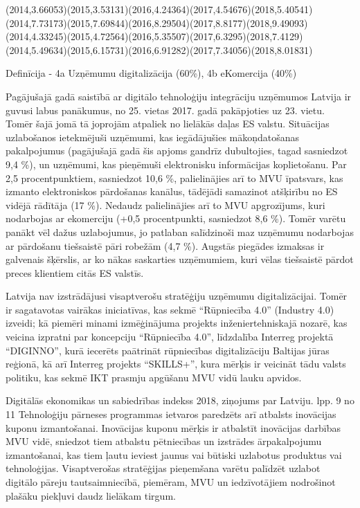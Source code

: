  {(2014,3.66053)(2015,3.53131)(2016,4.24364)(2017,4.54676)(2018,5.40541)}
  {(2014,7.73173)(2015,7.69844)(2016,8.29504)(2017,8.8177)(2018,9.49093)}
  {(2014,4.33245)(2015,4.72564)(2016,5.35507)(2017,6.3295)(2018,7.4129)}
  {(2014,5.49634)(2015,6.15731)(2016,6.91282)(2017,7.34056)(2018,8.01831)}

  Definīcija - 4a Uzņēmumu digitalizācija (60\%), 4b eKomercija (40\%)
\par

Pagājušajā gadā saistībā ar digitālo tehnoloģiju integrāciju uzņēmumos Latvija ir guvusi
labus panākumus, no 25. vietas 2017. gadā pakāpjoties uz 23. vietu. Tomēr šajā jomā tā
joprojām atpaliek no lielākās daļas ES valstu. Situācijas uzlabošanos ietekmējuši uzņēmumi,
kas iegādājušies mākoņdatošanas pakalpojumus (pagājušajā gadā šis apjoms gandrīz
dubultojies, tagad sasniedzot 9,4 \%), un uzņēmumi, kas pieņēmuši elektronisku informācijas
koplietošanu. Par 2,5 procentpunktiem, sasniedzot 10,6 \%, palielinājies arī to MVU īpatsvars,
kas izmanto elektroniskos pārdošanas kanālus, tādējādi samazinot atšķirību no ES vidējā
rādītāja (17 \%). Nedaudz palielinājies arī to MVU apgrozījums, kuri nodarbojas ar ekomerciju 
(+0,5 procentpunkti, sasniedzot 8,6 \%). Tomēr varētu panākt vēl dažus
uzlabojumus, jo patlaban salīdzinoši maz uzņēmumu nodarbojas ar pārdošanu tiešsaistē pāri
robežām (4,7 \%). Augstās piegādes izmaksas ir galvenais šķērslis, ar ko nākas saskarties
uzņēmumiem, kuri vēlas tiešsaistē pārdot preces klientiem citās ES valstīs.
\par
Latvija nav izstrādājusi visaptverošu stratēģiju uzņēmumu digitalizācijai. Tomēr ir
sagatavotas vairākas iniciatīvas, kas sekmē “Rūpniecība 4.0” (Industry 4.0) izveidi; kā
piemēri minami izmēģinājuma projekts inženiertehniskajā nozarē, kas veicina izpratni par
koncepciju “Rūpniecība 4.0”, līdzdalība Interreg projektā “DIGINNO”, kurā iecerēts paātrināt
rūpniecības digitalizāciju Baltijas jūras reģionā, kā arī Interreg projekts “SKILLS+”, kura
mērķis ir veicināt tādu valsts politiku, kas sekmē IKT prasmju apgūšanu MVU vidū lauku
apvidos.
\par
Digitālās ekonomikas un sabiedrības indekss 2018, ziņojums par Latviju. lpp. 9 no 11
Tehnoloģiju pārneses programmas ietvaros paredzēts arī atbalsts inovācijas kuponu
izmantošanai. Inovācijas kuponu mērķis ir atbalstīt inovācijas darbības MVU vidē, sniedzot
tiem atbalstu pētniecības un izstrādes ārpakalpojumu izmantošanai, kas tiem ļautu ieviest
jaunus vai būtiski uzlabotus produktus vai tehnoloģijas.
Visaptverošas stratēģijas pieņemšana varētu palīdzēt uzlabot digitālo pāreju
tautsaimniecībā, piemēram, MVU un iedzīvotājiem nodrošinot plašāku piekļuvi daudz
lielākam tirgum.